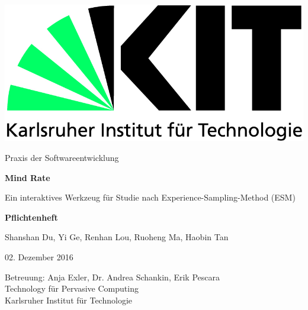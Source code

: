 \documentclass[a4paper]{scrreprt}
\begin{document}

    \begin{flushright}
        \includegraphics[scale = 0.7]{kit-logo.jpg}\\[0.5cm]
    \end{flushright}
    \vspace*{2cm}

    \begin{center} \large

        Praxis der Softwareentwicklung
        \vspace * {1.5cm}

        \textbf{\huge Mind Rate}
        
        \vspace*{1cm}
        
        {\Large Ein interaktives Werkzeug f\"ur Studie nach Experience-Sampling-Method (ESM)}

        \vspace*{1cm}

        \textbf{\Large Pflichtenheft}
        \vspace*{2cm}

        Shanshan Du, Yi Ge, Renhan Lou, Ruoheng Ma, Haobin Tan
        \vspace*{1cm}

        02. Dezember 2016
        \vspace*{2.5cm}


        Betreuung: Anja Exler, Dr. Andrea Schankin, Erik Pescara\\[1cm]
        Technology f\"ur Pervasive Computing\\[0.5cm]
        Karlsruher Institut für Technologie
    \end{center}
\end{document}
